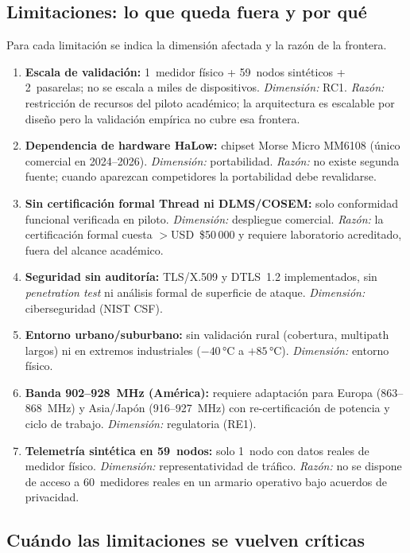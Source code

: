 \subsection{Limitaciones: lo que queda fuera y por qué}

Para cada limitación se indica la dimensión afectada y la razón de la frontera.

\begin{enumerate}
    \item \textbf{Escala de validación:} 1~medidor físico + 59~nodos sintéticos + 2~pasarelas; no se escala a miles de dispositivos. \emph{Dimensión:} RC1. \emph{Razón:} restricción de recursos del piloto académico; la arquitectura es escalable por diseño pero la validación empírica no cubre esa frontera.
    \item \textbf{Dependencia de hardware HaLow:} chipset Morse Micro MM6108 (único comercial en 2024--2026). \emph{Dimensión:} portabilidad. \emph{Razón:} no existe segunda fuente; cuando aparezcan competidores la portabilidad debe revalidarse.
    \item \textbf{Sin certificación formal Thread ni DLMS/COSEM:} solo conformidad funcional verificada en piloto. \emph{Dimensión:} despliegue comercial. \emph{Razón:} la certificación formal cuesta $>$USD~\$50\,000 y requiere laboratorio acreditado, fuera del alcance académico.
    \item \textbf{Seguridad sin auditoría:} TLS/X.509 y DTLS~1.2 implementados, sin \emph{penetration test} ni análisis formal de superficie de ataque. \emph{Dimensión:} ciberseguridad (NIST CSF).
    \item \textbf{Entorno urbano/suburbano:} sin validación rural (cobertura, multipath largos) ni en extremos industriales ($-40$\,°C a $+85$\,°C). \emph{Dimensión:} entorno físico.
    \item \textbf{Banda 902--928~MHz (América):} requiere adaptación para Europa (863--868~MHz) y Asia/Japón (916--927~MHz) con re-certificación de potencia y ciclo de trabajo. \emph{Dimensión:} regulatoria (RE1).
    \item \textbf{Telemetría sintética en 59~nodos:} solo 1~nodo con datos reales de medidor físico. \emph{Dimensión:} representatividad de tráfico. \emph{Razón:} no se dispone de acceso a 60~medidores reales en un armario operativo bajo acuerdos de privacidad.
\end{enumerate}

\subsection{Cuándo las limitaciones se vuelven críticas}

